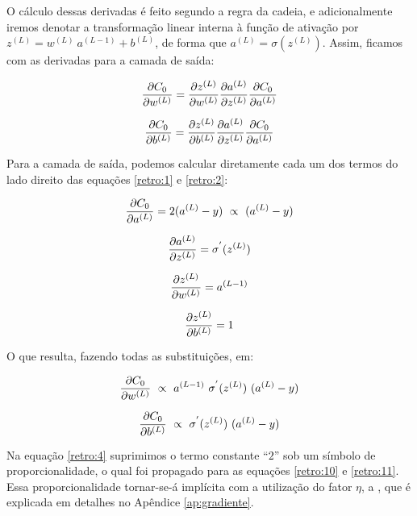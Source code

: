 O cálculo dessas derivadas é feito segundo a regra da cadeia, e adicionalmente iremos denotar a transformação linear interna à função de ativação por $z^{(L)} = w^{(L)}~a^{(L-1)} + b^{(L)}$, de forma que $a^{(L)} = \sigma(z^{(L)})$. Assim, ficamos com as derivadas para a camada de saída:

\begin{equation}\label{retro:1}
\frac{\partial C_0}{\partial w^{(L)}} = \frac{\partial z^{(L)}}{\partial w^{(L)}} \frac{\partial a^{(L)}}{\partial z^{(L)}} \frac{\partial C_0}{\partial a^{(L)}}
\end{equation}

\begin{equation}\label{retro:2}
\frac{\partial C_0}{\partial b^{(L)}} = \frac{\partial z^{(L)}}{\partial b^{(L)}} \frac{\partial a^{(L)}}{\partial z^{(L)}} \frac{\partial C_0}{\partial a^{(L)}}
\end{equation}

Para a camada de saída, podemos calcular diretamente cada um dos termos do lado direito das equações \ref{retro:1} e \ref{retro:2}:

\begin{equation}\label{retro:4}
\frac{\partial C_0}{\partial a^{(L)}} = 2(a^{(L)} - y) ~\propto~ (a^{(L)} - y)
\end{equation}

\begin{equation}\label{retro:5}
\frac{\partial a^{(L)}}{\partial z^{(L)}} = \sigma^{'}(z^{(L)})
\end{equation}

\begin{equation}\label{retro:6}
\frac{\partial z^{(L)}}{\partial w^{(L)}} = a^{(L-1)}
\end{equation}

\begin{equation}\label{retro:7}
\frac{\partial z^{(L)}}{\partial b^{(L)}} = 1
\end{equation}

O que resulta, fazendo todas as substituições, em:

\begin{equation}\label{retro:10}
\frac{\partial C_0}{\partial w^{(L)}} ~\propto~ a^{(L-1)}~ \sigma^{'}(z^{(L)})~ (a^{(L)} - y)
\end{equation}

\begin{equation}\label{retro:11}
\frac{\partial C_0}{\partial b^{(L)}} ~\propto~ \sigma^{'}(z^{(L)})~ (a^{(L)} - y)
\end{equation}

Na equação \ref{retro:4} suprimimos o termo constante ``$2$'' sob um símbolo de proporcionalidade, o qual foi propagado para as equações \ref{retro:10} e \ref{retro:11}. Essa proporcionalidade tornar-se-á implícita com a utilização do fator $\eta$, a , que é explicada em detalhes no Apêndice \ref{ap:gradiente}. 

